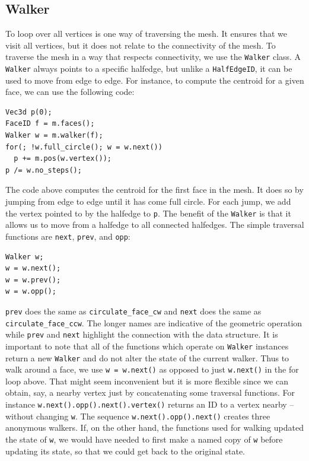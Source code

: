 \documentclass[a4paper]{article}
\begin{document}
\subsection{Walker}
To loop over all vertices is one way of traversing the mesh. It ensures that we visit all vertices, but it does not relate to the connectivity of the mesh. 
To traverse the mesh in a way that respects connectivity, we use the \texttt{Walker} class. A \texttt{Walker} always points to a specific halfedge, but unlike a \texttt{HalfEdgeID}, it can be used to move from edge to edge. For instance, to compute the centroid for a given face, we can use the following code:
\begin{verbatim}
Vec3d p(0);
FaceID f = m.faces();
Walker w = m.walker(f);
for(; !w.full_circle(); w = w.next())
  p += m.pos(w.vertex()); 
p /= w.no_steps();
\end{verbatim}
The code above computes the centroid for the first face in the mesh. It does so by jumping from edge to edge until it has come full circle. For each jump, we add the vertex pointed to by the halfedge to \texttt{p}. The benefit of the \texttt{Walker} is that it allows us to move from a halfedge to all connected halfedges. The simple traversal functions are \texttt{next}, \texttt{prev}, and \texttt{opp}:
\begin{verbatim}
Walker w;
w = w.next(); 
w = w.prev();
w = w.opp();
\end{verbatim}
\texttt{prev} does the same as \texttt{circulate\_face\_cw} and \texttt{next} does the same as \\\texttt{circulate\_face\_ccw}. The longer names are indicative of the geometric operation while \texttt{prev} and \texttt{next} highlight the connection with the data structure.    It is important to note that all of the functions which operate on \texttt{Walker} instances return a new \texttt{Walker} and do not alter the state of the current walker. Thus to walk around a face, we use \texttt{w = w.next()} as opposed to just \texttt{w.next()} in the for loop above. 
That might seem inconvenient but it is more flexible since we can obtain, say, a nearby vertex just by concatenating some traversal functions. For instance \texttt{w.next().opp().next().vertex()} returns an ID to a vertex nearby  -- without changing \texttt{w}. The sequence \texttt{w.next().opp().next()} creates three anonymous walkers. If, on the other hand, the functions used for walking updated the state of  \texttt{w}, we would have needed to first make a named copy of \texttt{w} before updating its state, so that we could get back to the original state.
\end{document}
